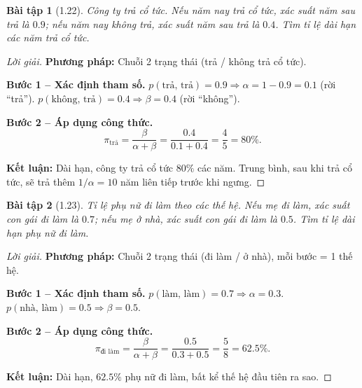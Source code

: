 \documentclass[8pt,a4paper]{article}
\newtheorem{exercise}{Bài tập}
\newenvironment{solution}{\begin{proof}[Lời giải]}{\end{proof}}
\begin{document}
\begin{exercise}[1.22]
Công ty trả cổ tức. Nếu năm nay trả cổ tức, xác suất năm sau trả là $0.9$; nếu năm nay không trả, xác suất năm sau trả là $0.4$. Tìm tỉ lệ dài hạn các năm trả cổ tức.
\end{exercise}
\begin{solution}
\textbf{Phương pháp:} Chuỗi 2 trạng thái (trả / không trả cổ tức).

\textbf{Bước 1 -- Xác định tham số.}
$p(\text{trả, trả}) = 0.9 \Rightarrow \alpha = 1 - 0.9 = 0.1$ (rời ``trả''). $p(\text{không, trả}) = 0.4 \Rightarrow \beta = 0.4$ (rời ``không'').

\textbf{Bước 2 -- Áp dụng công thức.}
\[
  \pi_{\text{trả}} = \frac{\beta}{\alpha+\beta} = \frac{0.4}{0.1+0.4} = \frac{4}{5} = 80\%.
\]

\textbf{Kết luận:} Dài hạn, công ty trả cổ tức $80\%$ các năm. Trung bình, sau khi trả cổ tức, sẽ trả thêm $1/\alpha = 10$ năm liên tiếp trước khi ngưng.
\end{solution}

\begin{exercise}[1.23]
Tỉ lệ phụ nữ đi làm theo các thế hệ. Nếu mẹ đi làm, xác suất con gái đi làm là $0.7$; nếu mẹ ở nhà, xác suất con gái đi làm là $0.5$. Tìm tỉ lệ dài hạn phụ nữ đi làm.
\end{exercise}
\begin{solution}
\textbf{Phương pháp:} Chuỗi 2 trạng thái (đi làm / ở nhà), mỗi bước = 1 thế hệ.

\textbf{Bước 1 -- Xác định tham số.}
$p(\text{làm, làm}) = 0.7 \Rightarrow \alpha = 0.3$. $p(\text{nhà, làm}) = 0.5 \Rightarrow \beta = 0.5$.

\textbf{Bước 2 -- Áp dụng công thức.}
\[
  \pi_{\text{đi làm}} = \frac{\beta}{\alpha+\beta} = \frac{0.5}{0.3+0.5} = \frac{5}{8} = 62.5\%.
\]

\textbf{Kết luận:} Dài hạn, $62.5\%$ phụ nữ đi làm, bất kể thế hệ đầu tiên ra sao.
\end{solution}
\end{document}
